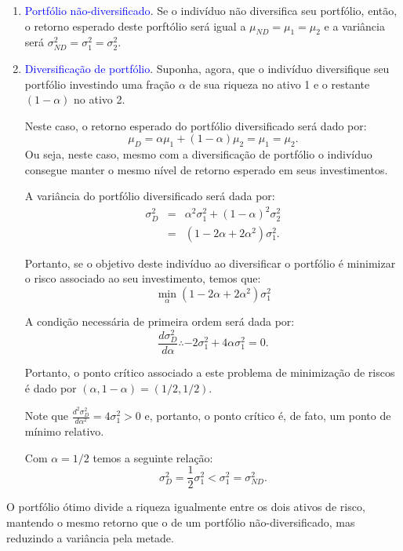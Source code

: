 \documentclass[preprintnumbers,nofootinbib,amsmath,amssymb,12pt]{article}
\begin{document}
\begin{enumerate}
    \item \textcolor{blue}{Portfólio não-diversificado}. Se o indivíduo não diversifica seu portfólio, então, o retorno esperado deste porftólio será igual a $\mu_{ND} = \mu_1 = \mu_2$ e a variância será $\sigma_{ND}^2 = \sigma_1^2 = \sigma_2^2$.
    
    \item \textcolor{blue}{Diversificação de portfólio}. Suponha, agora, que o indivíduo diversifique seu portfólio investindo uma fração $\alpha$ de sua riqueza no ativo 1 e o restante $(1-\alpha)$ no ativo 2.
    
    Neste caso, o retorno esperado do portfólio diversificado será dado por:
    \[
    \mu_D = \alpha \mu_1 + (1-\alpha)\mu_2 = \mu_1 = \mu_2.
    \]
    Ou seja, neste caso, mesmo com a diversificação de portfólio o indivíduo consegue manter o mesmo nível de retorno esperado em seus investimentos.
    
    A variância do portfólio diversificado será dada por:
    \begin{eqnarray*}
    \sigma_D^2 &=& \alpha^2 \sigma_1^2 + (1-\alpha)^2\sigma_2^2 \\
    &=& (1 - 2\alpha + 2\alpha^2)\sigma_1^2.
    \end{eqnarray*}
    
    Portanto, se o objetivo deste indivíduo ao diversificar o portfólio é minimizar o risco associado ao seu investimento, temos que:
    \[
    \min_{\alpha} (1 - 2\alpha + 2\alpha^2)\sigma_1^2
    \]
    
    A condição necessária de primeira ordem será dada por:
    \[
    \frac{d\sigma_D^2}{d\alpha} \therefore -2\sigma_1^2 + 4\alpha\sigma_1^2 = 0.
    \]
    
    Portanto, o ponto crítico associado a este problema de minimização de riscos é dado por $(\alpha, 1-\alpha) = (1/2, 1/2)$.
    
    Note que $\frac{d^2\sigma_D^2}{d\alpha^2} = 4\sigma_1^2 > 0$ e, portanto, o ponto crítico é, de fato, um ponto de mínimo relativo.
    
    Com $\alpha = 1/2$ temos a seguinte relação:
    \[
    \sigma_D^2 = \frac{1}{2}\sigma_1^2 < \sigma_1^2 = \sigma_{ND}^2.
    \]
    \end{enumerate}
    
    O portfólio ótimo divide a riqueza igualmente entre os dois ativos de risco, mantendo o mesmo retorno que o de um portfólio não-diversificado, mas reduzindo a variância pela metade.
    
\end{document}
